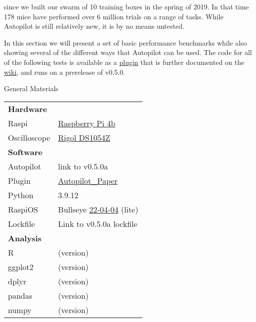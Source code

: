
 since we built our swarm of 10 training boxes in the spring of 2019. In that time 178 mice have performed over 6 million trials on a range of tasks. While Autopilot is still relatively new, it is by no means untested.

In this section we will present a set of basic performance benchmarks while also showing several of the different ways that Autopilot can be used. The code for all of the following tests is available as a \href{https://github.com/auto-pi-lot/plugin-tests}{plugin} that is further documented on the \href{https://wiki.auto-pi-lot.com/index.php/Plugin:Autopilot_Paper}{wiki}, and runs on a prerelease of v0.5.0. 

\begin{margintable}[-0.5cm]
\caption{General Materials}
\label{tab:materials}
\noindent\begin{tabularx}{\linewidth}{lX}%
\toprule
\textbf{Hardware} & \\
Raspi & \href{https://www.raspberrypi.org/products/raspberry-pi-4-model-b/}{Raspberry Pi 4b}\\
Oscilloscope & \href{https://wiki.auto-pi-lot.com/index.php/Rigol\_DS1054Z}{Rigol DS1054Z} \\
\midrule
\textbf{Software} & \\
Autopilot & link to v0.5.0a \\
Plugin & \href{https://wiki.auto-pi-lot.com/index.php/Plugin:Autopilot\_Paper}{Autopilot\_Paper} \\
Python & 3.9.12 \\
RaspiOS & Bullseye \href{https://downloads.raspberrypi.org/raspios_lite_armhf/images/raspios\_lite\_armhf-2022-04-07/}{22-04-04} (lite) \\
Lockfile & Link to v0.5.0a lockfile \\
\midrule
\textbf{Analysis} & \\
R & (version) \\
ggplot2 & (version) \\
dplyr & (version) \\
pandas & (version) \\
numpy & (version) \\ 
\bottomrule
\end{tabularx}
\end{margintable}
